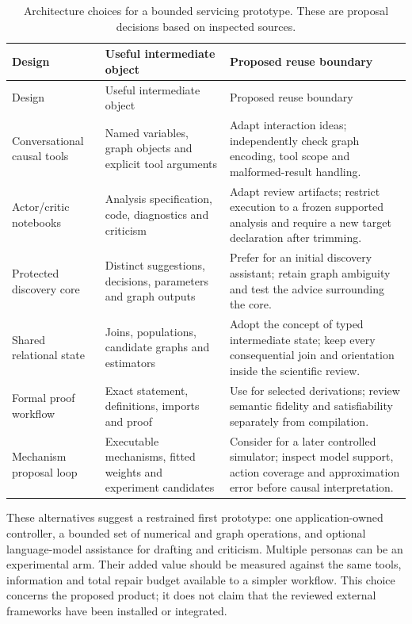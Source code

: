 \begin{longtable}{@{}P{.19\textwidth}P{.35\textwidth}P{.39\textwidth}@{}}
\caption{Architecture choices for a bounded servicing prototype. These are
proposal decisions based on inspected sources.}\label{exec13:architecture-choices}\\
\toprule
Design & Useful intermediate object & Proposed reuse boundary\\\midrule
\endfirsthead
\toprule Design & Useful intermediate object & Proposed reuse boundary\\\midrule
\endhead
Conversational causal tools & Named variables, graph objects and explicit
tool arguments & Adapt interaction ideas; independently check graph encoding,
tool scope and malformed-result handling.\\
Actor/critic notebooks & Analysis specification, code, diagnostics and
criticism & Adapt review artifacts; restrict execution to a frozen supported
analysis and require a new target declaration after trimming.\\
Protected discovery core & Distinct suggestions, decisions, parameters and
graph outputs & Prefer for an initial discovery assistant; retain graph
ambiguity and test the advice surrounding the core.\\
Shared relational state & Joins, populations, candidate graphs and estimators
& Adopt the concept of typed intermediate state; keep every consequential
join and orientation inside the scientific review.\\
Formal proof workflow & Exact statement, definitions, imports and proof
& Use for selected derivations; review semantic fidelity and satisfiability
separately from compilation.\\
Mechanism proposal loop & Executable mechanisms, fitted weights and experiment
candidates & Consider for a later controlled simulator; inspect model support,
action coverage and approximation error before causal interpretation.\\
\bottomrule
\end{longtable}

These alternatives suggest a restrained first prototype: one application-owned
controller, a bounded set of numerical and graph operations, and optional
language-model assistance for drafting and criticism. Multiple personas can be
an experimental arm. Their added value should be measured against the same
tools, information and total repair budget available to a simpler workflow.
This choice concerns the proposed product; it does not claim that the reviewed
external frameworks have been installed or integrated.

